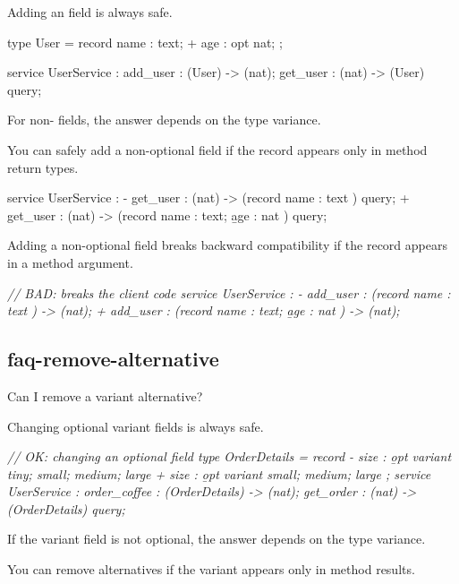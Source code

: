 \documentclass{article}
\begin{document}
Adding an  field is always safe.

\begin{code}[good]
 type User = record {
   name : text;
+  age : opt nat;
};

 service UserService : {
  add_user : (User) -> (nat);
  get_user : (nat) -> (User) query;
 }
\end{code}

For non- fields, the answer depends on the type variance.

You can safely add a non-optional field if the record appears only in method return types.
\begin{code}[good]
 service UserService : {
-  get_user : (nat) -> (record { name : text            }) query;
+  get_user : (nat) -> (record { name : text; \b{age : nat} }) query;
 }
\end{code}

Adding a non-optional field breaks backward compatibility if the record appears in a method argument.

\begin{code}[bad]
 \em{// BAD: breaks the client code}
 service UserService : {
-  add_user : (record { name : text            }) -> (nat);
+  add_user : (record { name : text; \b{age : nat} }) -> (nat);
 }
\end{code}

\subsection{faq-remove-alternative}{Can I remove a variant alternative?}

Changing optional variant fields is always safe.

\begin{code}[good]
 \em{// OK: changing an optional field}
 type OrderDetails = record {
-  size : \b{opt} variant { tiny; small; medium; large }
+  size : \b{opt} variant {       small; medium; large }
 };
 service UserService : {
   order_coffee : (OrderDetails) -> (nat);
   get_order : (nat) -> (OrderDetails) query;
 }
\end{code}

If the variant field is not optional, the answer depends on the type variance.

You can remove alternatives if the variant appears only in method results.
\end{document}
